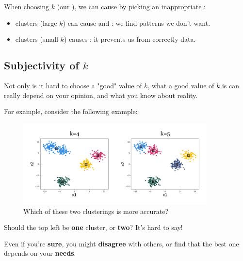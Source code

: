         \begin{concept}
            When choosing $k$ (our ), we can cause  by picking an inappropriate :
            
            \begin{itemize}
                \item {} clusters (large $k$) can cause  and : we find patterns we don't want.
                
                \item {} clusters (small $k$) causes : it prevents us from correctly  data.
            \end{itemize}
        \end{concept}
        
    \subsection{Subjectivity of $k$}
    
        Not only is it hard to choose a "good" value of $k$, what a good value of $k$ is can really depend on your opinion, and what you know about reality.
        
        For example, consider the following example:
        
        \begin{figure}[H]
            \centering
            \includegraphics[width=100mm,scale=0.4]{images/clustering_images/subjective_k_value.png}
            \caption*{Which of these two clusterings is more accurate?}
        \end{figure}
        
        Should the top left be \textbf{one} cluster, or \textbf{two}? It's hard to say!
        
        Even if you're \textbf{sure}, you might \textbf{disagree} with others, or find that the best one depends on your \textbf{needs}.
        
